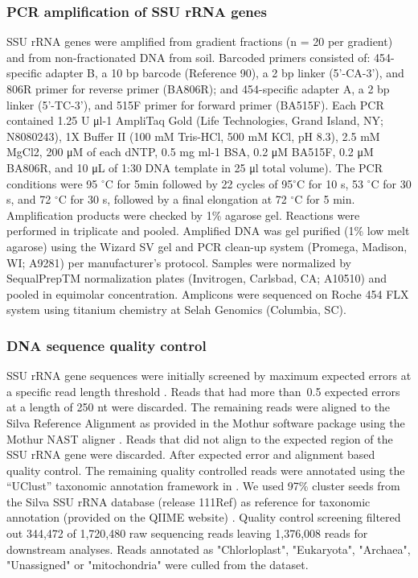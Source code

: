 \documentclass{article}
\begin{document}
\subsubsection{PCR amplification of SSU rRNA genes} 
SSU rRNA genes were amplified from gradient fractions (n = 20 per
gradient) and from non-fractionated DNA from soil. Barcoded primers
consisted of: 454-specific adapter B, a 10 bp barcode (Reference
90), a 2 bp linker (5’-CA-3’), and 806R primer for reverse primer
(BA806R); and 454-specific adapter A, a 2 bp linker (5’-TC-3’), and 515F
primer for forward primer (BA515F). Each PCR contained 1.25 U μl-1
AmpliTaq Gold (Life Technologies, Grand Island, NY; N8080243), 1X Buffer
II (100 mM Tris-HCl, 500 mM KCl, pH
8.3), 2.5 mM MgCl2, 200 μM of each dNTP, 0.5 mg ml-1 BSA, 0.2 μM BA515F, 0.2 μM
BA806R, and 10 μL of 1:30 DNA template in 25 μl total volume). The PCR
conditions were 95 $^{\circ}$C for 5min followed by 22 cycles of 95$^{\circ}$C
for 10 s, 53 $^{\circ}$C for 30 s, and 72 $^{\circ}$C for 30 s, followed by
a final elongation at 72 $^{\circ}$C for 5 min. Amplification products were
checked by 1\% agarose gel. Reactions were performed in triplicate and pooled.
Amplified DNA was gel purified (1\% low melt agarose) using the Wizard SV gel
and PCR clean-up system (Promega, Madison, WI; A9281) per manufacturer’s
protocol. Samples were normalized by SequalPrepTM normalization plates
(Invitrogen, Carlsbad, CA; A10510) and pooled in equimolar concentration.
Amplicons were sequenced on Roche 454 FLX system using titanium chemistry at
Selah Genomics (Columbia, SC).

\subsubsection{DNA sequence quality control}
SSU rRNA gene sequences were initially screened by maximum expected errors
at a specific read length threshold \citep{edgar2013}. Reads that had more
than~0.5 expected errors at a length of 250 nt were discarded. The
remaining reads were aligned to the Silva Reference Alignment as provided
in the Mothur software package using the Mothur NAST aligner
\citep{DeSantis2005,schloss2009}. Reads that did not align to the expected
region of the SSU rRNA gene were discarded. After expected error and
alignment based quality control. The remaining quality controlled reads
were annotated using the “UClust” taxonomic annotation framework in
\citep{caporaso2010,edgar2010}. We used 97\% cluster seeds from the Silva
SSU rRNA database (release 111Ref) \citep{quast2013} as reference for
taxonomic annotation (provided on the QIIME website) \citep{quast2013}.
Quality control screening filtered out 344,472 of 1,720,480 raw sequencing
reads leaving 1,376,008 reads for downstream analyses. Reads annotated as
"Chlorloplast", "Eukaryota", "Archaea", "Unassigned" or "mitochondria" were
culled from the dataset. 
\end{document}
